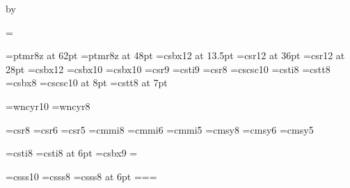 \advance\hoffset by\margin	%

\parindent=\baselineskip	%


\ifx\pdfoutput\undefined
\else
  \pdfpagewidth=6.30in
  \pdfpageheight=9.25in
\fi


\chyph

\def\={\discretionary{-}{-}{-}}


\def\hyphenall{%
  \lccode`.=`;%
  \lccode`/=`;%
  \lccode`:=`;%
  \lccode`0=`;%
  \lccode`1=`;%
  \lccode`2=`;%
  \lccode`3=`;%
  \lccode`4=`;%
  \lccode`5=`;%
  \lccode`6=`;%
  \lccode`7=`;%
  \lccode`8=`;%
  \lccode`9=`;%
  \lccode`~=`;%
  \lccode`\_=`;%
  \lccode`\-=`;%
  \lccode`\#=`;%
  \lccode`\==`;%
  \lccode`\&=`;%
  \lccode`\%=`;%
  \lccode`\?=`;%
  \lccode`+=`;%
}


\font\titlefnt=ptmr8z at 62pt
\font\titlespecfnt=ptmr8z at 48pt
\font\subtitlefnt=csbx12 at 13.5pt
\font\specialfnt=csr12 at 36pt
\font\bigfnt=csr12 at 28pt
\font\articlefnt=csbx12
\font\paragraphfnt=csbx10
\font\sectionfnt=csbx10
\font\noticefnt=csr9
\font\noticeitfnt=csti9
\font\smallfnt=csr8
\font\scfnt=cscsc10
\font\smallitfnt=csti8
\font\smallttfnt=cstt8
\font\smallbffnt=csbx8
\font\smallscfnt=cscsc10 at 8pt	%
\font\sixttfnt=cstt8 at 7pt


\font\tencyr=wncyr10
\font\eightcyr=wncyr8
\def\cyr{\tencyr\cyracc}

\font\rmlg=csr8 \font\rms=csr6 \font\rmss=csr5
\font\mthlg=cmmi8 \font\mths=cmmi6 \font\mthss=cmmi5
\font\symlg=cmsy8 \font\syms=cmsy6 \font\symss=cmsy5

\font\eightti=csti8
\font\sixti=csti8 at 6pt
\font\ninebf=csbx9
\scriptfont\itfam=\eightti

\font\tensf=csss10
\font\eightsf=csss8
\font\sixsf=csss8 at 6pt
\newfam\sffam
\def\sf{\fam\sffam\tensf}
\textfont\sffam=\tensf \scriptfont\sffam=\eightsf \scriptscriptfont\sffam=\sixsf

\def\fontdir{fonts/}
\newfam\vefam

